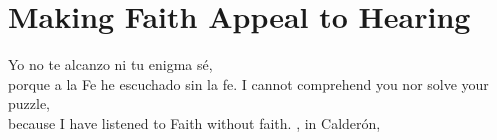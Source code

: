 
%
%
%


\chapter{Making Faith Appeal to Hearing}
\label{ch:faith-hearing}

\epigraphTranslation
{Yo no te alcanzo ni tu enigma sé, \\ 
porque a la Fe he escuchado sin la fe.}
{I cannot comprehend you nor solve your puzzle, \\
because I have listened to Faith without faith.}
{, in Calderón, }

